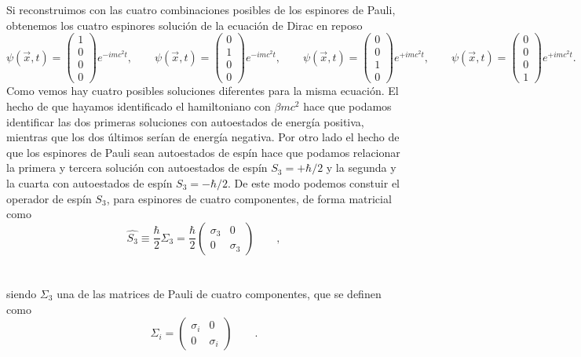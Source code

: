 \documentclass[11pt,letterpaper]{article}     %
\begin{document}
Si reconstruimos con las cuatro combinaciones posibles de los espinores de Pauli, obtenemos los cuatro espinores solución de la ecuación de Dirac en reposo
\begin{equation} \label{eq:50}
\psi(\vec{x},t) =
\begin{pmatrix}
1 \\ 0 \\ 0 \\ 0
\end{pmatrix}e^{-imc^2t}, \qquad
\psi(\vec{x},t) =
\begin{pmatrix}
0 \\ 1 \\ 0 \\ 0
\end{pmatrix}e^{-imc^2t}, \qquad
\psi(\vec{x},t) =
\begin{pmatrix}
0 \\ 0 \\ 1 \\ 0
\end{pmatrix}e^{+imc^2t}, \qquad
\psi(\vec{x},t) =
\begin{pmatrix}
0 \\ 0 \\ 0 \\ 1
\end{pmatrix}e^{+imc^2t}.
\end{equation}
Como vemos hay cuatro posibles soluciones diferentes para la misma ecuación. El hecho de que hayamos identificado el hamiltoniano con $\beta mc^2$ hace que podamos identificar las dos primeras soluciones con autoestados de energía positiva, mientras que los dos últimos serían de energía negativa. Por otro lado el hecho de que los espinores de Pauli sean autoestados de espín hace que podamos relacionar la primera y tercera solución con autoestados de espín $S_3=+\hbar/2$ y la segunda y la cuarta con autoestados de espín $S_3=-\hbar/2$. De este modo podemos constuir el operador de espín $S_3$, para espinores de cuatro componentes, de forma matricial como
\begin{equation} \label{eq:51}
\hat{S_3} \equiv \frac{\hbar}{2}\Sigma_3 = \frac{\hbar}{2} \begin{pmatrix}
\sigma_3 & 0 \\ 0 & \sigma_3
\end{pmatrix} \qquad ,
\end{equation} \\ \\
siendo $\Sigma_3$ una de las matrices de Pauli de cuatro componentes, que se definen como
\begin{equation}\label{eq:52}
\Sigma_i =  \begin{pmatrix} \sigma_i & 0 \\ 0 & \sigma_i \end{pmatrix} \qquad .
\end{equation}
\end{document}
